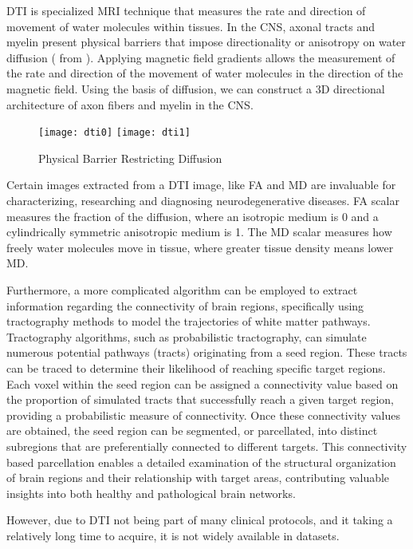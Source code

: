 \ac{DTI} is specialized \ac{MRI} technique that measures the rate and direction of movement of water molecules within tissues. In the \ac{CNS}, axonal tracts and myelin present physical barriers that impose directionality or anisotropy on water diffusion ( from \cite{dti}). Applying magnetic field gradients allows the measurement of the rate and direction of the movement of water molecules in the direction of the magnetic field. Using the basis of diffusion, we can construct a 3D directional architecture of axon fibers and myelin in the \ac{CNS}. \cite{dti}
\begin{figure}[H]
\centering
\texttt{[image: dti0]}
\texttt{[image: dti1]}
\caption{Physical Barrier Restricting Diffusion}
\label{fig:dti}
\end{figure}
Certain images extracted from a \ac{DTI} image, like \ac{FA} and \ac{MD} are invaluable for characterizing, researching and diagnosing neurodegenerative diseases. \ac{FA} scalar measures the fraction of the diffusion, where an isotropic medium is 0 and a cylindrically symmetric anisotropic medium is 1. The \ac{MD} scalar measures how freely water molecules move in tissue, where greater tissue density means lower \ac{MD}. \cite{rd}\par
Furthermore, a more complicated algorithm can be employed to extract information regarding the connectivity of brain regions, specifically using tractography methods to model the trajectories of white matter pathways. Tractography algorithms, such as probabilistic tractography, can simulate numerous potential pathways (tracts) originating from a seed region. These tracts can be traced to determine their likelihood of reaching specific target regions. Each voxel within the seed region can be assigned a connectivity value based on the proportion of simulated tracts that successfully reach a given target region, providing a probabilistic measure of connectivity. Once these connectivity values are obtained, the seed region can be segmented, or parcellated, into distinct subregions that are preferentially connected to different targets. This connectivity based parcellation enables a detailed examination of the structural organization of brain regions and their relationship with target areas, contributing valuable insights into both healthy and pathological brain networks. \cite{tract} \cite{tract2}\par
However, due to \ac{DTI} not being part of many clinical protocols, and it taking a relatively long time to acquire, it is not widely available in datasets.

